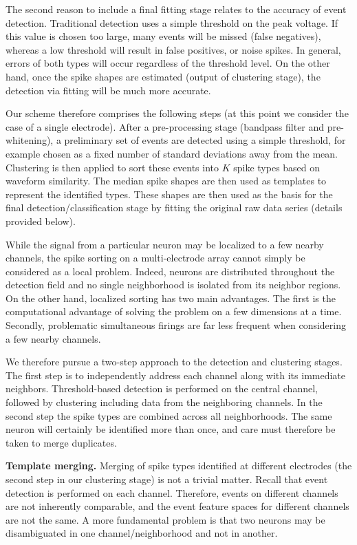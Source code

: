 \documentclass[10pt]{article}
\begin{document}
The second reason to include a final fitting stage relates to the accuracy of event detection. Traditional detection uses a simple threshold on the peak voltage. If this value is chosen too large, many events will be missed (false negatives), whereas a low threshold will result in false positives, or noise spikes. In general, errors of both types will occur regardless of the threshold level. On the other hand, once the spike shapes are estimated (output of clustering stage), the detection via fitting will be much more accurate.

Our scheme therefore comprises the following steps (at this point we consider the case of a single electrode). After a pre-processing stage (bandpass filter and pre-whitening), a preliminary set of events are detected using a simple threshold, for example chosen as a fixed number of standard deviations away from the mean. Clustering is then applied to sort these events into $K$ spike types based on waveform similarity. The median spike shapes are then used as templates to represent the identified types. These shapes are then used as the basis for the final detection/classification stage by fitting the original raw data series (details provided below).

While the signal from a particular neuron may be localized to a few nearby channels, the spike sorting on a multi-electrode array cannot simply be considered as a local problem. Indeed, neurons are distributed throughout the detection field and no single neighborhood is isolated from its neighbor regions. On the other hand, localized sorting has two main advantages. The first is the computational advantage of solving the problem on a few dimensions at a time. Secondly, problematic simultaneous firings are far less frequent when considering a few nearby channels.

We therefore pursue a two-step approach to the detection and clustering stages. The first step is to independently address each channel along with its immediate neighbors. Threshold-based detection is performed on the central channel, followed by clustering including data from the neighboring channels. In the second step the spike types are combined across all neighborhoods. The same neuron will certainly be identified more than once, and care must therefore be taken to merge duplicates.

\textbf{Template merging.} Merging of spike types identified at different electrodes (the second step in our clustering stage) is not a trivial matter. Recall that event detection is performed on each channel. Therefore, events on different channels are not inherently comparable, and the event feature spaces for different channels are not the same. A more fundamental problem is that two neurons may be disambiguated in one channel/neighborhood and not in another.
\end{document}
